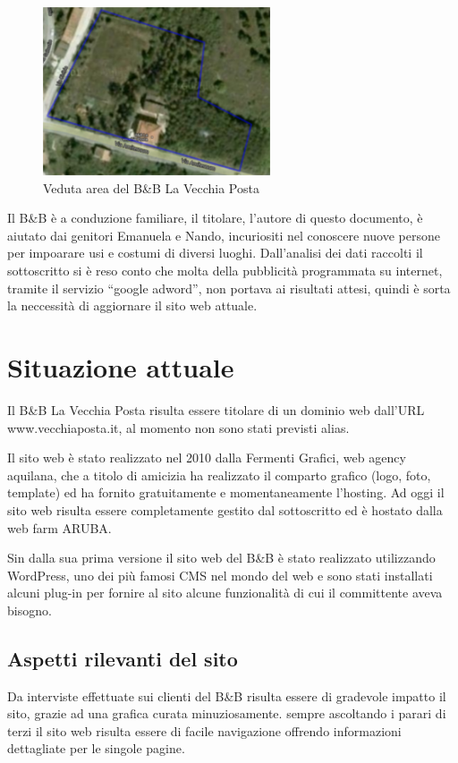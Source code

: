 \documentclass[a4paper,12pt,hidelinks]{report}
\begin{document}
\begin{figure}[h!]%
	\includegraphics[width=0.6\textwidth,keepaspectratio=true]{img/bbArea1}
	\centering
	\caption{Veduta area del B\&B La Vecchia Posta}%
	\label{fig:bbArea}%
\end{figure}
Il B\&B è a conduzione familiare, il titolare, l'autore di questo documento, è aiutato dai genitori Emanuela e Nando, incuriositi nel conoscere nuove persone per impoarare usi e costumi di diversi luoghi.
Dall'analisi dei dati raccolti il sottoscritto si è reso conto che molta della pubblicità programmata su internet, tramite il servizio ``google adword'', non portava ai risultati attesi,
quindi è sorta la neccessità di aggiornare il sito web attuale.

\section{Situazione attuale}
Il B\&B La Vecchia Posta risulta essere titolare di un dominio web dall'URL www.vecchiaposta.it, al momento non sono stati previsti alias. 
\par Il sito web è stato realizzato nel 2010 dalla Fermenti Grafici, web agency aquilana, che a titolo di amicizia ha realizzato
il comparto grafico (logo, foto, template) ed ha fornito gratuitamente e momentaneamente l'hosting.
Ad oggi il sito web risulta essere completamente gestito dal sottoscritto ed è hostato dalla web farm ARUBA.
\par Sin dalla sua prima versione il sito web del B\&B è stato realizzato utilizzando WordPress, uno dei più famosi CMS nel mondo del web e sono stati installati alcuni plug-in per fornire al sito alcune funzionalità di cui il committente aveva bisogno.

\subsection{Aspetti rilevanti del sito}
Da interviste effettuate sui clienti del B\&B risulta essere di gradevole impatto il sito, grazie ad una grafica curata minuziosamente.
sempre ascoltando i parari di terzi il sito web risulta essere di facile navigazione offrendo informazioni dettagliate per le singole pagine.
\end{document}
